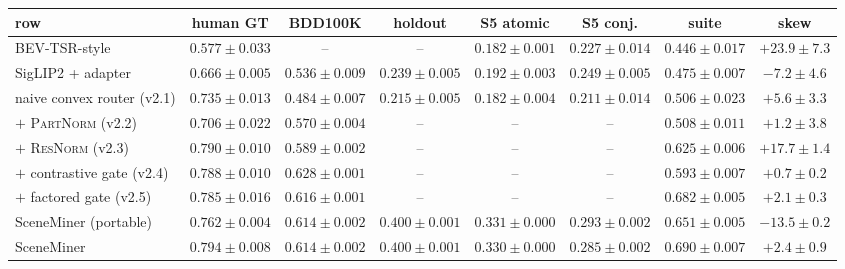 \begin{tabular}{lccccccc}
\toprule
row & human GT & BDD100K & holdout & S5 atomic & S5 conj. & suite & skew\\
\midrule
BEV-TSR-style & $0.577\pm0.033$ & -- & -- & $0.182\pm0.001$ & $0.227\pm0.014$ & $0.446\pm0.017$ & $+23.9\pm7.3$\\
SigLIP2 + adapter & $0.666\pm0.005$ & $0.536\pm0.009$ & $0.239\pm0.005$ & $0.192\pm0.003$ & $0.249\pm0.005$ & $0.475\pm0.007$ & $-7.2\pm4.6$\\
naive convex router (v2.1) & $0.735\pm0.013$ & $0.484\pm0.007$ & $0.215\pm0.005$ & $0.182\pm0.004$ & $0.211\pm0.014$ & $0.506\pm0.023$ & $+5.6\pm3.3$\\
$+$ \textsc{PartNorm} (v2.2) & $0.706\pm0.022$ & $0.570\pm0.004$ & -- & -- & -- & $0.508\pm0.011$ & $+1.2\pm3.8$\\
$+$ \textsc{ResNorm} (v2.3) & $0.790\pm0.010$ & $0.589\pm0.002$ & -- & -- & -- & $0.625\pm0.006$ & $+17.7\pm1.4$\\
$+$ contrastive gate (v2.4) & $0.788\pm0.010$ & $0.628\pm0.001$ & -- & -- & -- & $0.593\pm0.007$ & $+0.7\pm0.2$\\
$+$ factored gate (v2.5) & $0.785\pm0.016$ & $0.616\pm0.001$ & -- & -- & -- & $0.682\pm0.005$ & $+2.1\pm0.3$\\
SceneMiner (portable) & $0.762\pm0.004$ & $0.614\pm0.002$ & $0.400\pm0.001$ & $0.331\pm0.000$ & $0.293\pm0.002$ & $0.651\pm0.005$ & $-13.5\pm0.2$\\
SceneMiner & $0.794\pm0.008$ & $0.614\pm0.002$ & $0.400\pm0.001$ & $0.330\pm0.000$ & $0.285\pm0.002$ & $0.690\pm0.007$ & $+2.4\pm0.9$\\
\bottomrule
\end{tabular}
